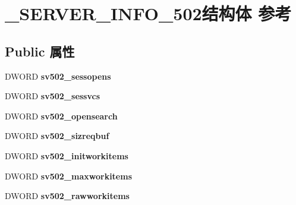 \hypertarget{struct___s_e_r_v_e_r___i_n_f_o__502}{}\section{\+\_\+\+S\+E\+R\+V\+E\+R\+\_\+\+I\+N\+F\+O\+\_\+502结构体 参考}
\label{struct___s_e_r_v_e_r___i_n_f_o__502}
\subsection*{Public 属性}
\begin{DoxyCompactItemize}
\item 
\mbox{\label{struct___s_e_r_v_e_r___i_n_f_o__502_a5b509b0b504a4cba3b357c39db5a54d2}} 
D\+W\+O\+RD {\bfseries sv502\+\_\+sessopens}
\item 
\mbox{\label{struct___s_e_r_v_e_r___i_n_f_o__502_af9b81b4ac314e42dc85f21b9f04c3eec}} 
D\+W\+O\+RD {\bfseries sv502\+\_\+sessvcs}
\item 
\mbox{\label{struct___s_e_r_v_e_r___i_n_f_o__502_a4b3bf9028aa5e3bf06410885235bb08b}} 
D\+W\+O\+RD {\bfseries sv502\+\_\+opensearch}
\item 
\mbox{\label{struct___s_e_r_v_e_r___i_n_f_o__502_ab9bc0a2d28db060927382c17d844d69a}} 
D\+W\+O\+RD {\bfseries sv502\+\_\+sizreqbuf}
\item 
\mbox{\label{struct___s_e_r_v_e_r___i_n_f_o__502_a923422cd46a949b9ddeb0e749a01634c}} 
D\+W\+O\+RD {\bfseries sv502\+\_\+initworkitems}
\item 
\mbox{\label{struct___s_e_r_v_e_r___i_n_f_o__502_a8ccd7b71da69d3cd87cff838b73bb31c}} 
D\+W\+O\+RD {\bfseries sv502\+\_\+maxworkitems}
\item 
\mbox{\label{struct___s_e_r_v_e_r___i_n_f_o__502_a4e2979e65a1f5e386a7b2878b4ae6463}} 
D\+W\+O\+RD {\bfseries sv502\+\_\+rawworkitems}
\item 
\mbox{\label{struct___s_e_r_v_e_r___i_n_f_o__502_a907984a9c2f946c60d07dde3a9f4537b}} 

\end{DoxyCompactItemize}
